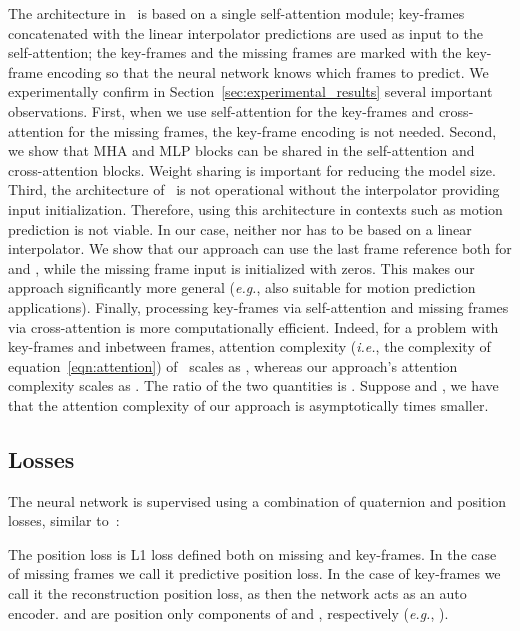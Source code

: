 \documentclass[letterpaper]{article} \usepackage[]{aaai23}  \usepackage{times}  \usepackage{helvet}  \usepackage{courier}  \usepackage[hyphens]{url}  \usepackage{graphicx} \urlstyle{rm} \def\UrlFont{\rm}  \usepackage{natbib}  \usepackage{caption} \frenchspacing  \setlength{\pdfpagewidth}{8.5in} \setlength{\pdfpageheight}{11in}
\begin{document}
The architecture in~\cite{duan2021singleshot} is based on a single self-attention module; key-frames concatenated with the linear interpolator predictions are used as input to the self-attention; the key-frames and the missing frames are marked with the key-frame encoding so that the neural network knows which frames to predict. We experimentally confirm in Section~\ref{sec:experimental_results} several important observations. First, when we use self-attention for the key-frames and cross-attention for the missing frames, the key-frame encoding is not needed. Second, we show that MHA and MLP blocks can be shared in the self-attention and cross-attention blocks. Weight sharing is important for reducing the model size. Third, the architecture of~\citet{duan2021singleshot} is not operational without the interpolator providing input initialization. Therefore, using this architecture in contexts such as motion prediction is not viable. In our case, neither  nor  has to be based on a linear interpolator. We show that our approach can use the last frame reference both for  and , while the missing frame input is initialized with zeros. This makes our approach significantly more general (\emph{e.g.}, also suitable for motion prediction applications). Finally, processing key-frames via self-attention and missing frames via cross-attention is more computationally efficient. Indeed, for a problem with  key-frames and  inbetween frames, attention complexity (\emph{i.e.}, the complexity of equation~\eqref{eqn:attention}) of~\cite{duan2021singleshot} scales as , whereas our approach's attention complexity scales as . The ratio of the two quantities is . Suppose  and , we have that the attention complexity of our approach is asymptotically  times smaller.



\subsection{Losses}
The neural network is supervised using a combination of quaternion and position losses, similar to~\cite{duan2021singleshot}:

The position loss is L1 loss defined both on missing and key-frames. In the case of missing frames we call it predictive position loss. In the case of key-frames we call it the reconstruction position loss, as then the network acts as an auto encoder.  and  are position only components of  and , respectively (\emph{e.g.}, ).
\end{document}
